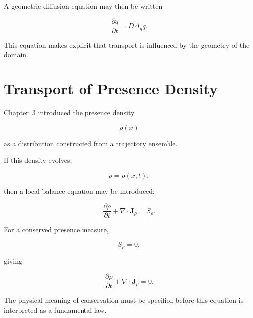 \documentclass[12pt,oneside]{book}
\begin{document}
A geometric diffusion equation may then be written

\begin{equation}
    \frac{\partial q}{\partial t}
    =
    D\Delta_g q.
    \label{eq:manifold-diffusion}
\end{equation}

This equation makes explicit that transport is influenced by the
geometry of the domain.


\section{Transport of Presence Density}
\label{sec:presence-density-transport}

Chapter~3 introduced the presence density

\begin{equation}
    \rho(x)
\end{equation}

as a distribution constructed from a trajectory ensemble.

If this density evolves,

\begin{equation}
    \rho
    =
    \rho(x,t),
\end{equation}

then a local balance equation may be introduced:

\begin{equation}
    \frac{\partial\rho}{\partial t}
    +
    \nabla\cdot\mathbf{J}_{\rho}
    =
    S_{\rho}.
    \label{eq:presence-density-balance}
\end{equation}

For a conserved presence measure,

\begin{equation}
    S_{\rho}
    =
    0,
\end{equation}

giving

\begin{equation}
    \frac{\partial\rho}{\partial t}
    +
    \nabla\cdot\mathbf{J}_{\rho}
    =
    0.
    \label{eq:presence-density-continuity}
\end{equation}

The physical meaning of conservation must be specified before
this equation is interpreted as a fundamental law.
\end{document}
